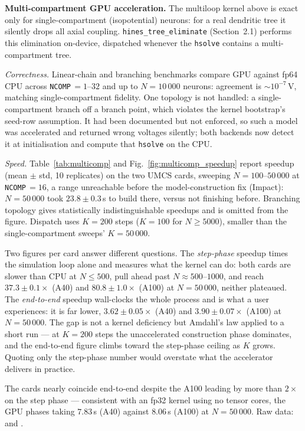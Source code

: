 \documentclass[preprint,12pt, a4paper]{elsarticle}
\newcommand{\hte}{\texttt{hines\_\allowbreak tree\_\allowbreak eliminate}}
\begin{document}
\begin{enumerate}
\textbf{Multi-compartment GPU acceleration.} The multiloop kernel above is exact only for single-compartment (isopotential) neurons: for a real dendritic tree it silently drops all axial coupling. \hte{} (Section~2.1) performs this elimination on-device, dispatched whenever the \texttt{hsolve} contains a multi-compartment tree.

\emph{Correctness.} Linear-chain and branching benchmarks compare GPU against fp64 CPU across \texttt{NCOMP}\,$=1$--$32$ and up to $N=10\,000$ neurons: agreement is $\sim$$10^{-7}$\,V, matching single-compartment fidelity. One topology is not handled: a single-compartment branch off a branch point, which violates the kernel bootstrap's seed-row assumption. It had been documented but not enforced, so such a model was accelerated and returned wrong voltages silently; both backends now detect it at initialisation and compute that \texttt{hsolve} on the CPU.

\emph{Speed.} Table~\ref{tab:multicomp} and Fig.~\ref{fig:multicomp_speedup} report speedup (mean $\pm$ std, 10 replicates) on the two UMCS cards, sweeping $N=100$--$50\,000$ at \texttt{NCOMP}\,$=16$, a range unreachable before the model-construction fix (Impact): $N=50\,000$ took $23.8\pm0.3$\,s to build there, versus not finishing before. Branching topology gives statistically indistinguishable speedups and is omitted from the figure. Dispatch uses $K=200$ steps ($K=100$ for $N\geq5000$), smaller than the single-compartment sweeps' $K=50\,000$.

Two figures per card answer different questions. The \emph{step-phase} speedup times the simulation loop alone and measures what the kernel can do: both cards are slower than CPU at $N\leq500$, pull ahead past $N\approx500$--$1000$, and reach $37.3\pm0.1\times$ (A40) and $80.8\pm1.0\times$ (A100) at $N=50\,000$, neither plateaued. The \emph{end-to-end} speedup wall-clocks the whole process and is what a user experiences: it is far lower, $3.62\pm0.05\times$ (A40) and $3.90\pm0.07\times$ (A100) at $N=50\,000$. The gap is not a kernel deficiency but Amdahl's law applied to a short run --- at $K=200$ steps the unaccelerated construction phase dominates, and the end-to-end figure climbs toward the step-phase ceiling as $K$ grows. Quoting only the step-phase number would overstate what the accelerator delivers in practice.

The cards nearly coincide end-to-end despite the A100 leading by more than $2\times$ on the step phase --- consistent with an fp32 kernel using no tensor cores, the GPU phases taking $7.83$\,s (A40) against $8.06$\,s (A100) at $N=50\,000$. Raw data: \protect{} and \protect{}.


\end{enumerate}
\end{document}
